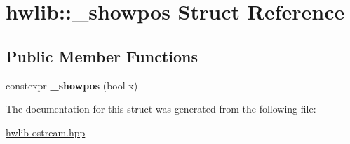 \hypertarget{structhwlib_1_1__showpos}{}\section{hwlib\+:\+:\+\_\+showpos Struct Reference}
\label{structhwlib_1_1__showpos}
\subsection*{Public Member Functions}
\begin{DoxyCompactItemize}
\item 
constexpr {\bfseries \+\_\+showpos} (bool x)\hypertarget{structhwlib_1_1__showpos_acc9f9e1970e3b70823e9dac74dc942b0}{}\label{structhwlib_1_1__showpos_acc9f9e1970e3b70823e9dac74dc942b0}

\end{DoxyCompactItemize}


The documentation for this struct was generated from the following file\+:\begin{DoxyCompactItemize}
\item 
\hyperlink{hwlib-ostream_8hpp}{hwlib-\/ostream.\+hpp}\end{DoxyCompactItemize}
